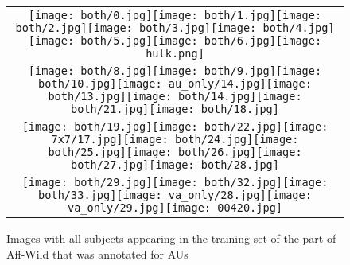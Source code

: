 \documentclass[a4paper, 10pt, conference]{ieeeconf}      %
\begin{document}
\begin{figure}[h]
\centering
\begin{tabular}{ c  }
\texttt{[image: both/0.jpg]}\texttt{[image: both/1.jpg]}\texttt{[image: both/2.jpg]}\texttt{[image: both/3.jpg]}\texttt{[image: both/4.jpg]}\texttt{[image: both/5.jpg]}\texttt{[image: both/6.jpg]}\texttt{[image: hulk.png]}\\
\texttt{[image: both/8.jpg]}\texttt{[image: both/9.jpg]}\texttt{[image: both/10.jpg]}\texttt{[image: au\_only/14.jpg]}\texttt{[image: both/13.jpg]}\texttt{[image: both/14.jpg]}\texttt{[image: both/21.jpg]}\texttt{[image: both/18.jpg]}\\
 \texttt{[image: both/19.jpg]}\texttt{[image: both/22.jpg]}\texttt{[image: 7x7/17.jpg]}\texttt{[image: both/24.jpg]}\texttt{[image: both/25.jpg]}\texttt{[image: both/26.jpg]}\texttt{[image: both/27.jpg]}\texttt{[image: both/28.jpg]}\\
\texttt{[image: both/29.jpg]}\texttt{[image: both/32.jpg]}\texttt{[image: both/33.jpg]}\texttt{[image: va\_only/28.jpg]}\texttt{[image: va\_only/29.jpg]}\texttt{[image: 00420.jpg]} 
\end{tabular}
\caption{Images with all subjects appearing in the training set of the part of Aff-Wild that was annotated for AUs}
\label{all_identities}
\end{figure}
 




\end{document}
